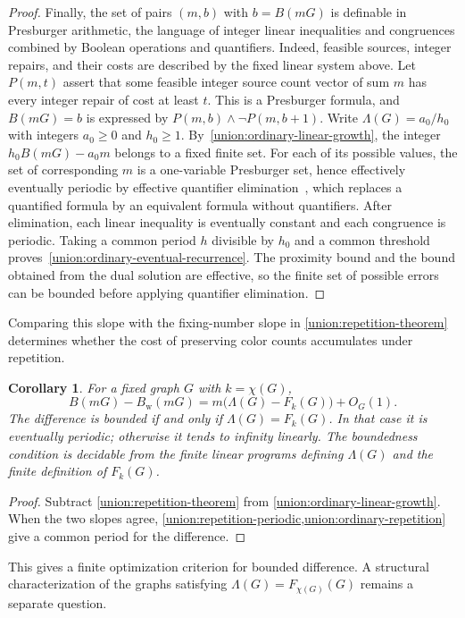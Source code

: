 \documentclass[10pt,a4paper]{amsart}
\numberwithin{equation}{section}
\newtheorem{corollary}[theorem]{Corollary}
\theoremstyle{definition}
\theoremstyle{remark}
\begin{document}
\begin{proof}
Finally, the set of pairs $(m,b)$ with $b=B(mG)$ is definable in
Presburger arithmetic, the language of integer linear inequalities
and congruences combined by Boolean operations and quantifiers.
Indeed, feasible sources,
integer repairs, and their costs are described by the fixed linear
system above. Let $P(m,t)$ assert that some feasible integer source
count vector of sum $m$ has every integer repair of cost at least $t$.
This is a Presburger formula, and $B(mG)=b$ is expressed by
$P(m,b)\wedge\neg P(m,b+1)$. Write $\Lambda(G)=a_0/h_0$ with
integers $a_0\ge0$ and $h_0\ge1$.
By~\eqref{union:ordinary-linear-growth}, the integer
$h_0B(mG)-a_0m$ belongs to a fixed finite set.
For each of its possible values, the set of corresponding $m$ is a
one-variable Presburger set, hence effectively eventually periodic
by effective quantifier elimination~\cite{ginsburg1966,haase2024},
which replaces a quantified formula by an equivalent formula without
quantifiers. After elimination, each
linear inequality is eventually constant and each congruence is
periodic. Taking a common period $h$ divisible by $h_0$ and a common
threshold proves~\eqref{union:ordinary-eventual-recurrence}.
The proximity bound and the bound obtained from the dual solution
are effective, so
the finite set of possible errors can be bounded before applying
quantifier elimination.
\end{proof}


Comparing this slope with the fixing-number slope in
\cref{union:repetition-theorem} determines whether the cost of preserving
color counts accumulates under repetition.

\begin{corollary}\label{union:repetition-gap}
For a fixed graph $G$ with $k=\chi(G)$,
\[
 B(mG)-B_{\mathrm w}(mG)
   =m\bigl(\Lambda(G)-F_k(G)\bigr)+O_G(1).
\]
The difference is bounded if and only if $\Lambda(G)=F_k(G)$.
In that case it is eventually periodic; otherwise it tends to
infinity linearly. The boundedness condition is decidable from the
finite linear programs defining $\Lambda(G)$ and the finite
definition of $F_k(G)$.
\end{corollary}
\begin{proof}
Subtract \cref{union:repetition-theorem} from
\eqref{union:ordinary-linear-growth}. When the two slopes agree,
\cref{union:repetition-periodic,union:ordinary-repetition} give a
common period for the difference.
\end{proof}

This gives a finite optimization criterion for bounded difference.
A structural characterization of the graphs satisfying
$\Lambda(G)=F_{\chi(G)}(G)$ remains a separate question.
\end{document}
